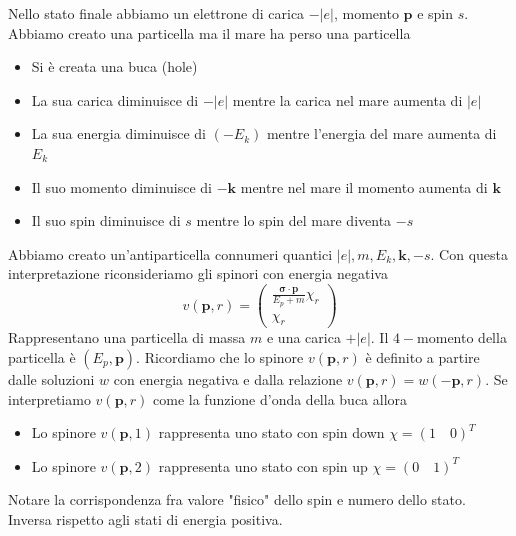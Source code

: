 Nello stato finale abbiamo un elettrone di carica $-|e|$, momento $\mathbf{p}$ e spin $s$. Abbiamo creato una particella ma il mare ha perso una particella
\begin{itemize}
    \item Si è creata una buca (hole)
    \item La sua carica diminuisce di $-|e|$ mentre la carica nel mare aumenta di $|e|$
    \item La sua energia diminuisce di $(-E_k)$ mentre l'energia del mare aumenta di $E_k$
    \item Il suo momento diminuisce di $-\mathbf{k}$ mentre nel mare il momento aumenta di $\mathbf{k}$
    \item Il suo spin diminuisce di $s$ mentre lo spin del mare diventa $-s$
\end{itemize}
Abbiamo creato un'antiparticella connumeri quantici $|e|,m,E_k,\mathbf{k},-s$. Con questa interpretazione riconsideriamo gli spinori con energia negativa
\begin{equation*}
    v(\mathbf{p}, r) = \begin{pmatrix} \frac{\boldsymbol{\sigma} \cdot \mathbf{p}}{E_p + m} \chi_r \\ \chi_r \end{pmatrix}
\end{equation*}
Rappresentano una particella di massa $m$ e una carica $+|e|$. Il $4-$momento della particella è $(E_p,\mathbf{p})$. Ricordiamo che lo spinore $v(\mathbf{p}, r)$ è definito a partire dalle soluzioni $w$ con energia negativa e dalla relazione $v(\mathbf{p}, r)= w(-\mathbf{p}, r)$. Se interpretiamo  $v(\mathbf{p}, r)$ come la funzione d'onda della buca allora
\begin{itemize}
    \item Lo spinore  $v(\mathbf{p}, 1)$ rappresenta uno stato con spin down $\chi=(1\quad 0)^T$
    \item Lo spinore $v(\mathbf{p}, 2)$ rappresenta uno stato con spin up $\chi=(0\quad 1)^T$
\end{itemize}
Notare la corrispondenza fra valore "fisico" dello spin e numero dello stato. Inversa rispetto agli stati di energia positiva.